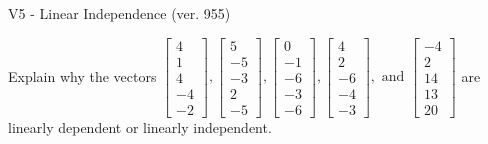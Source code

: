 \begin{exercise}
  \begin{exerciseTitle}V5 - Linear Independence (ver. 955)\end{exerciseTitle}
  \begin{exerciseStatement}
    Explain why the vectors \(\left[\begin{array}{r}
4 \\
1 \\
4 \\
-4 \\
-2
\end{array}\right] , \left[\begin{array}{r}
5 \\
-5 \\
-3 \\
2 \\
-5
\end{array}\right] , \left[\begin{array}{r}
0 \\
-1 \\
-6 \\
-3 \\
-6
\end{array}\right] , \left[\begin{array}{r}
4 \\
2 \\
-6 \\
-4 \\
-3
\end{array}\right] , \text{ and } \left[\begin{array}{r}
-4 \\
2 \\
14 \\
13 \\
20
\end{array}\right]\) are linearly dependent or linearly independent.	



\end{exerciseStatement}
\end{exercise}
